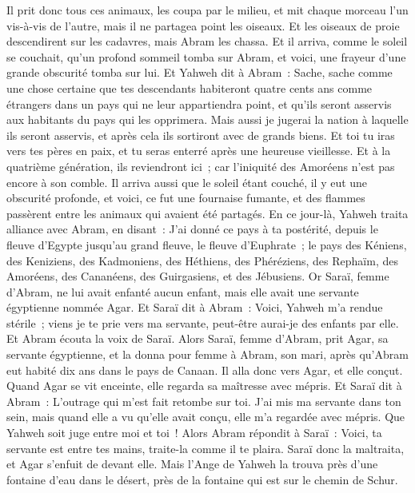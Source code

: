\begin{multicols}{2}
Il prit donc tous ces animaux, les coupa par le milieu, et mit chaque morceau l'un vis-à-vis de l'autre, mais il ne partagea point les oiseaux.
Et les oiseaux de proie descendirent sur les cadavres, mais Abram les chassa.
Et il arriva, comme le soleil se couchait, qu'un profond sommeil tomba sur Abram, et voici, une frayeur d'une grande obscurité tomba sur lui.
Et Yahweh dit à Abram~: Sache, sache comme une chose certaine que tes descendants habiteront quatre cents ans comme étrangers dans un pays qui ne leur appartiendra point, et qu'ils seront asservis aux habitants du pays qui les opprimera.
Mais aussi je jugerai la nation à laquelle ils seront asservis, et après cela ils sortiront avec de grands biens.
Et toi tu iras vers tes pères en paix, et tu seras enterré après une heureuse vieillesse.
Et à la quatrième génération, ils reviendront ici~; car l'iniquité des Amoréens n'est pas encore à son comble.
Il arriva aussi que le soleil étant couché, il y eut une obscurité profonde, et voici, ce fut une fournaise fumante, et des flammes passèrent entre les animaux qui avaient été partagés.
En ce jour-là, Yahweh traita alliance avec Abram, en disant~: J'ai donné ce pays à ta postérité, depuis le fleuve d'Egypte jusqu'au grand fleuve, le fleuve d'Euphrate~;
le pays des Kéniens, des Keniziens, des Kadmoniens,
des Héthiens, des Phéréziens, des Rephaïm,
des Amoréens, des Cananéens, des Guirgasiens, et des Jébusiens.
\VerseOne{}Or Saraï, femme d'Abram, ne lui avait enfanté aucun enfant, mais elle avait une servante égyptienne nommée Agar.
Et Saraï dit à Abram~: Voici, Yahweh m'a rendue stérile~; viens je te prie vers ma servante, peut-être aurai-je des enfants par elle. Et Abram écouta la voix de Saraï.
Alors Saraï, femme d'Abram, prit Agar, sa servante égyptienne, et la donna pour femme à Abram, son mari, après qu'Abram eut habité dix ans dans le pays de Canaan.
Il alla donc vers Agar, et elle conçut. Quand Agar se vit enceinte, elle regarda sa maîtresse avec mépris.
Et Saraï dit à Abram~: L'outrage qui m'est fait retombe sur toi. J'ai mis ma servante dans ton sein, mais quand elle a vu qu'elle avait conçu, elle m'a regardée avec mépris. Que Yahweh soit juge entre moi et toi~!
Alors Abram répondit à Saraï~: Voici, ta servante est entre tes mains, traite-la comme il te plaira. Saraï donc la maltraita, et Agar s'enfuit de devant elle.
Mais l'Ange de Yahweh la trouva près d'une fontaine d'eau dans le désert, près de la fontaine qui est sur le chemin de Schur.

\end{multicols}
